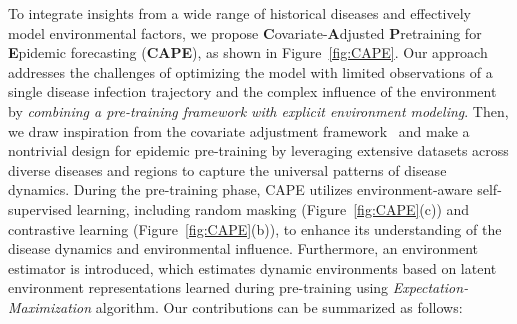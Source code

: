 To integrate insights from a wide range of historical diseases and effectively model environmental factors, we propose \textbf{C}ovariate-\textbf{A}djusted \textbf{P}retraining for \textbf{E}pidemic forecasting (\textbf{CAPE}), as shown in Figure~\ref{fig:CAPE}. Our approach addresses the challenges of optimizing the model with limited observations of a single disease infection trajectory and the complex influence of the environment by \textit{combining a pre-training framework with explicit environment modeling}.  Then, we draw inspiration from the covariate adjustment framework~\cite{runge2023causal} and make a nontrivial design for epidemic pre-training by leveraging extensive datasets across diverse diseases and regions to capture the universal patterns of disease dynamics. During the pre-training phase, CAPE utilizes environment-aware self-supervised learning, including random masking (Figure~\ref{fig:CAPE}(c)) and contrastive learning (Figure~\ref{fig:CAPE}(b)), to enhance its understanding of the disease dynamics and environmental influence. Furthermore, an environment estimator is introduced, which estimates dynamic environments based on latent environment representations learned during pre-training using \textit{Expectation-Maximization} algorithm. Our contributions can be summarized as follows:


